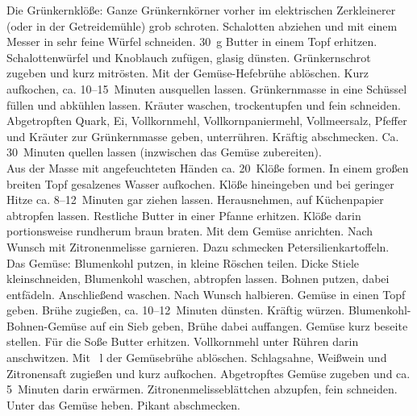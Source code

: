 
      \begin{zubereitung}
        Die Grünkernklöße: Ganze Grünkernkörner vorher im elektrischen
	Zerkleinerer (oder in der Getreidemühle) grob schroten. Schalotten
	abziehen und mit einem Messer in sehr feine Würfel schneiden. 30~g
	Butter in einem Topf erhitzen. Schalottenwürfel und Knoblauch zufügen,
	glasig dünsten. Grünkernschrot zugeben und kurz mitrösten. Mit der
	Gemüse-Hefebrühe ablöschen. Kurz aufkochen, ca. 10--15~Minuten
	ausquellen lassen. Grünkernmasse in eine Schüssel füllen und abkühlen
	lassen. Kräuter waschen, trockentupfen und fein schneiden. Abgetropften
	Quark, Ei, Vollkornmehl, Vollkornpaniermehl, Vollmeersalz, Pfeffer
	und Kräuter zur Grünkernmasse geben, unterrühren. Kräftig abschmecken.
	Ca. 30~Minuten quellen lassen (inzwischen das Gemüse zubereiten). \\
	Aus der Masse mit angefeuchteten Händen ca. 20~Klöße formen. In einem
	großen breiten Topf gesalzenes Wasser aufkochen. Klöße hineingeben und
	bei geringer Hitze ca. 8--12~Minuten gar ziehen lassen. Herausnehmen,
	auf Küchenpapier abtropfen lassen. Restliche Butter in einer Pfanne
	erhitzen. Klöße darin portionsweise rundherum braun braten. Mit dem
	Gemüse anrichten. Nach Wunsch mit Zitronenmelisse garnieren. Dazu
	schmecken Petersilienkartoffeln. \\
	Das Gemüse: Blumenkohl putzen, in kleine Röschen teilen. Dicke Stiele
	kleinschneiden, Blumenkohl waschen, abtropfen lassen. Bohnen putzen,
	dabei entfädeln. Anschließend waschen. Nach Wunsch halbieren. Gemüse
	in einen Topf geben. Brühe zugießen, ca. 10--12~Minuten dünsten.
	Kräftig würzen. Blumenkohl-Bohnen-Gemüse auf ein Sieb geben, Brühe
	dabei auffangen. Gemüse kurz beseite stellen. Für die Soße Butter
	erhitzen. Vollkornmehl unter Rühren darin anschwitzen. Mit \brda{}~l
	der Gemüsebrühe ablöschen. Schlagsahne, Weißwein und Zitronensaft
	zugießen und kurz aufkochen. Abgetropftes Gemüse zugeben und ca.
	5~Minuten darin erwärmen. Zitronenmelisseblättchen abzupfen, fein
	schneiden. Unter das Gemüse heben. Pikant abschmecken. \\
      \end{zubereitung}


